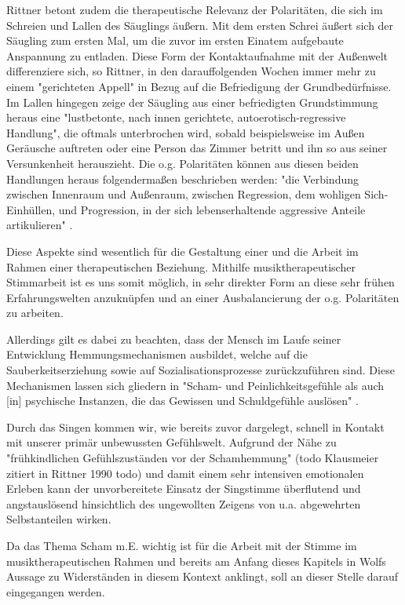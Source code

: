 Rittner \autocite [vgl.][106f.]{rittner1990} betont zudem die therapeutische Relevanz der Polaritäten, die sich im Schreien und Lallen des Säuglings äußern. Mit dem ersten Schrei äußert sich der Säugling zum ersten Mal, um die zuvor im ersten Einatem aufgebaute Anspannung zu entladen. Diese Form der Kontaktaufnahme mit der Außenwelt differenziere sich, so Rittner, in den darauffolgenden Wochen immer mehr zu einem "gerichteten Appell" in Bezug auf die Befriedigung der Grundbedürfnisse. Im Lallen hingegen zeige der Säugling aus einer befriedigten Grundstimmung heraus eine "lustbetonte, nach innen gerichtete, autoerotisch-regressive Handlung", die oftmals unterbrochen wird, sobald beispielsweise im Außen Geräusche auftreten oder eine Person das Zimmer betritt und ihn so aus seiner Versunkenheit herauszieht. 
Die o.g. Polaritäten können aus diesen beiden Handlungen heraus folgendermaßen beschrieben werden: "die Verbindung zwischen Innenraum und Außenraum, zwischen Regression, dem wohligen Sich-Einhüllen, und Progression, in der sich lebenserhaltende aggressive Anteile artikulieren" \autocite [vgl.][106f.]{rittner1990}.

Diese Aspekte sind wesentlich für die Gestaltung einer und die Arbeit im Rahmen einer therapeutischen Beziehung. Mithilfe musiktherapeutischer Stimmarbeit ist es uns somit möglich, in sehr direkter Form an diese sehr frühen Erfahrungswelten anzuknüpfen und an einer Ausbalancierung der o.g. Polaritäten zu arbeiten. 

Allerdings gilt es dabei zu beachten, dass der Mensch im Laufe seiner Entwicklung Hemmungsmechanismen ausbildet, welche auf die Sauberkeitserziehung sowie auf Sozialisationsprozesse zurückzuführen sind. Diese Mechanismen lassen sich gliedern in "Scham- und Peinlichkeitsgefühle als auch [in] psychische Instanzen, die das Gewissen und Schuldgefühle auslösen" \autocite [106f.]{rittner1990}. 

Durch das Singen kommen wir, wie bereits zuvor dargelegt, schnell in Kontakt mit unserer primär unbewussten Gefühlswelt. Aufgrund der Nähe zu "frühkindlichen Gefühlszuständen vor der Schamhemmung" (todo Klausmeier zitiert in Rittner 1990 todo) und damit einem sehr intensiven emotionalen Erleben kann der unvorbereitete Einsatz der Singstimme überflutend und angstauslösend hinsichtlich des ungewollten Zeigens von u.a. abgewehrten Selbstanteilen wirken. 

Da das Thema Scham m.E. wichtig ist für die Arbeit mit der Stimme im musiktherapeutischen Rahmen und bereits am Anfang dieses Kapitels in Wolfs Aussage zu Widerständen in diesem Kontext anklingt, soll an dieser Stelle darauf eingegangen werden.

